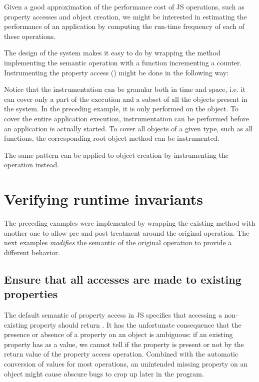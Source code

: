 Given a good approximation of the performance cost of JS operations, such as
property accesses and object creation, we might be interested in estimating the
performance of an application by computing the run-time frequency of each of
these operations.

The design of the system makes it easy to do by wrapping the method
implementing the semantic operation with a function incrementing a counter.
Instrumenting the property access () might be done in the
following way:


Notice that the instrumentation can be granular both in time and space, i.e. it
can cover only a part of the execution and a subset of all the objects present
in the system. In the preceding example, it is only performed on the 
object. To cover the entire application execution, instrumentation can be performed before
an application is actually started. To cover all objects of a given type, such
as all functions, the corresponding root object method can be instrumented.

The same pattern can be applied to object creation by instrumenting the
 operation instead.


\section{Verifying runtime invariants}

The preceding examples were implemented by wrapping the existing method with
another one to allow pre and post treatment around the original operation. The
next examples \textit{modifies} the semantic of the original operation to
provide a different behavior.

\subsection{Ensure that all accesses are made to existing properties}

The default semantic of property access in JS specifies that accessing
a non-existing property should return . It has the unfortunate
consequence that the presence or absence of a property on an object is
ambiguous: if an existing property has  as a value, we cannot
tell if the property is present or not by the return value of the property
access operation. Combined with the automatic conversion of values for most
operations, an unintended missing property on an object might cause obscure
bugs to crop up later in the program.


